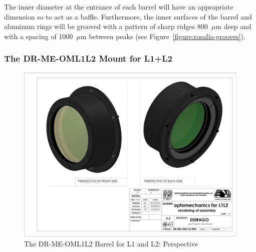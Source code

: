 \documentclass{article}
\newcommand{\micron}{\mbox{$\mu$m}}
\begin{document}
The inner diameter at the entrance of each barrel will have an appropriate dimension so to act as a baffle. Furthermore, the inner surfaces of the barrel and aluminum rings will be grooved with a pattern of sharp ridges 800~{\micron} deep and with a spacing of 1000~{\micron} between peaks (see Figure~\ref{figure:rosalia-grooves}).

\subsubsection{The DR-ME-OML1L2 Mount for L1+L2}

\begin{figure}
\begin{center}
\includegraphics[height=\linewidth,angle=90]{figures/DR-ME-OML1L2-REN}
\end{center}
\caption{The DR-ME-OML1L2 Barrel for L1 and L2: Perspective}
\label{figure:rosalia-oml1l2-perspective}
\end{figure}
\end{document}
